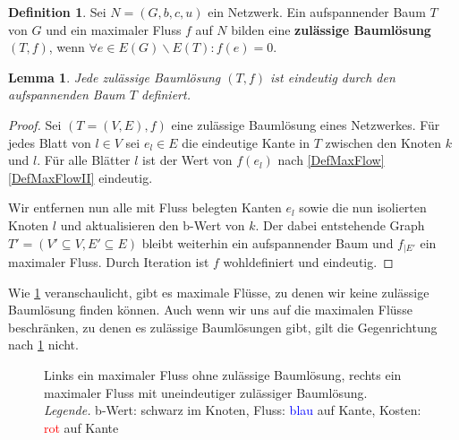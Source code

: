 \documentclass[a4paper,twoside,ngerman]{report}
\theoremstyle{plain}
\newtheorem{lem}[thm]{Lemma}
\theoremstyle{definition}
\newtheorem{defn}[thm]{Definition}
\begin{document}
\begin{defn}Sei $N=(G,b,c,u)$ ein Netzwerk. Ein aufspannender Baum $T$ von $G$ und ein maximaler Fluss $f$ auf $N$ bilden eine \textbf{zulässige Baumlösung} $(T,f)$, wenn $\forall e\in E(G)\backslash E(T): f(e) = 0$.\end{defn}

\begin{lem}Jede zulässige Baumlösung $(T,f)$ ist eindeutig durch den aufspannenden Baum $T$ definiert.\end{lem}
\begin{proof}Sei $(T=(V,E),f)$ eine zulässige Baumlösung eines Netzwerkes. Für jedes Blatt von $l\in V$ sei $e_l\in E$ die eindeutige Kante in $T$ zwischen den Knoten $k$ und $l$. Für alle Blätter $l$ ist der Wert von $f(e_l)$ nach \cref{DefMaxFlow} \cref{DefMaxFlowII} eindeutig.
	
Wir entfernen nun alle mit Fluss belegten Kanten $e_l$ sowie die nun isolierten Knoten $l$ und aktualisieren den b-Wert von $k$. Der dabei entstehende Graph $T'=(V'\subseteq V,E'\subseteq E)$ bleibt weiterhin ein aufspannender Baum und $f_{|E'}$ ein maximaler Fluss. Durch Iteration ist $f$ wohldefiniert und eindeutig.\end{proof}

Wie \cref{fig:augm} veranschaulicht, gibt es maximale Flüsse, zu denen wir keine zulässige Baumlösung finden können. Auch wenn wir uns auf die maximalen Flüsse beschränken, zu denen es zulässige Baumlösungen gibt, gilt die Gegenrichtung nach \cref{fig:augm} nicht.

\begin{figure}[!h]\centering
{}
\caption{Links ein maximaler Fluss ohne zulässige Baumlösung, rechts ein maximaler Fluss mit uneindeutiger zulässiger Baumlösung.\protect\\
\protect\textit{Legende.} b-Wert: schwarz im Knoten, Fluss: \protect\textcolor{blue}{blau} auf Kante, Kosten: \protect\textcolor{red}{rot} auf Kante}
\label{fig:augm}
\end{figure}
\end{document}
